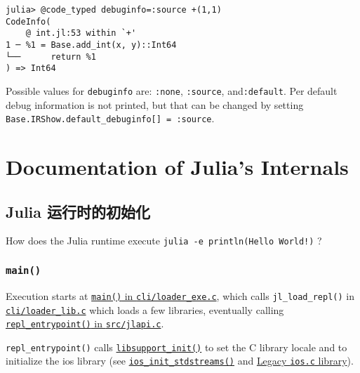 \begin{lstlisting}
julia> @code_typed debuginfo=:source +(1,1)
CodeInfo(
    @ int.jl:53 within `+'
1 ─ %1 = Base.add_int(x, y)::Int64
└──      return %1
) => Int64
\end{lstlisting}



Possible values for \texttt{debuginfo} are: \texttt{:none}, \texttt{:source}, and\texttt{:default}. Per default debug information is not printed, but that can be changed by setting \texttt{Base.IRShow.default\_debuginfo[] = :source}.



\chapter{Documentation of Julia's Internals}


\hypertarget{4805065256470472206}{}


\section{Julia 运行时的初始化}



How does the Julia runtime execute \texttt{julia -e {\textquotesingle}println({\textquotedbl}Hello World!{\textquotedbl}){\textquotesingle}} ?



\hypertarget{6651980781302015874}{}


\subsection{\texttt{main()}}



Execution starts at \href{https://github.com/JuliaLang/julia/blob/master/cli/loader\_exe.c}{\texttt{main()} in \texttt{cli/loader\_exe.c}}, which calls \texttt{jl\_load\_repl()} in \href{https://github.com/JuliaLang/julia/blob/master/cli/loader\_lib.c}{\texttt{cli/loader\_lib.c}} which loads a few libraries, eventually calling \href{https://github.com/JuliaLang/julia/blob/master/src/jlapi.c}{\texttt{repl\_entrypoint()} in \texttt{src/jlapi.c}}.



\texttt{repl\_entrypoint()} calls \href{https://github.com/JuliaLang/julia/blob/master/src/support/libsupportinit.c}{\texttt{libsupport\_init()}} to set the C library locale and to initialize the {\textquotedbl}ios{\textquotedbl} library (see \href{https://github.com/JuliaLang/julia/blob/master/src/support/ios.c}{\texttt{ios\_init\_stdstreams()}} and \hyperlink{3841537160196121279}{Legacy \texttt{ios.c} library}).



